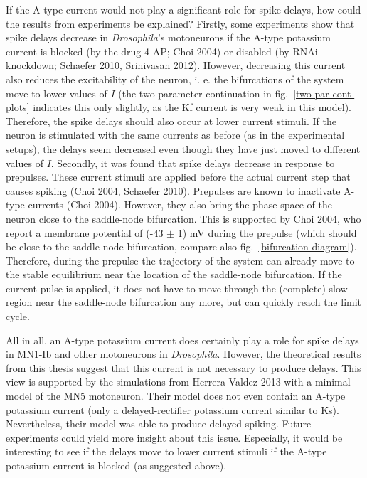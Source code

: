 \documentclass[12pt,a4paper,]{report}
\begin{document}
If the A-type current would not play a significant role for spike
delays, how could the results from experiments be explained? Firstly,
some experiments show that spike delays decrease in \emph{Drosophila}'s
motoneurons if the A-type potassium current is blocked (by the drug
4-AP; Choi 2004) or disabled (by RNAi knockdown; Schaefer 2010,
Srinivasan 2012). However, decreasing this current also reduces the
excitability of the neuron, i. e. the bifurcations of the system move to
lower values of $I$ (the two parameter continuation in
fig.~\ref{two-par-cont-plots} indicates this only slightly, as the Kf
current is very weak in this model). Therefore, the spike delays should
also occur at lower current stimuli. If the neuron is stimulated with
the same currents as before (as in the experimental setups), the delays
seem decreased even though they have just moved to different values of
$I$. Secondly, it was found that spike delays decrease in response to
prepulses. These current stimuli are applied before the actual current
step that causes spiking (Choi 2004, Schaefer 2010). Prepulses are known
to inactivate A-type currents (Choi 2004). However, they also bring the
phase space of the neuron close to the saddle-node bifurcation. This is
supported by Choi 2004, who report a membrane potential of (-43 $\pm$ 1) mV
during the prepulse (which should be close to the saddle-node
bifurcation, compare also fig.~\ref{bifurcation-diagram}). Therefore,
during the prepulse the trajectory of the system can already move to the
stable equilibrium near the location of the saddle-node bifurcation. If
the current pulse is applied, it does not have to move through the
(complete) slow region near the saddle-node bifurcation any more, but
can quickly reach the limit cycle.

All in all, an A-type potassium current does certainly play a role for
spike delays in MN1-Ib and other motoneurons in \emph{Drosophila}.
However, the theoretical results from this thesis suggest that this
current is not necessary to produce delays. This view is supported by
the simulations from Herrera-Valdez 2013 with a minimal model of the MN5
motoneuron. Their model does not even contain an A-type potassium
current (only a delayed-rectifier potassium current similar to Ks).
Nevertheless, their model was able to produce delayed spiking. Future
experiments could yield more insight about this issue. Especially, it
would be interesting to see if the delays move to lower current stimuli
if the A-type potassium current is blocked (as suggested above).
\end{document}
